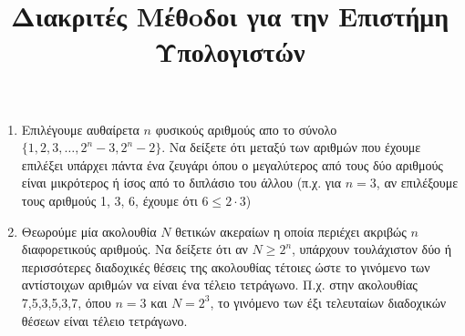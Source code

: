 \documentclass{assignment}
\begin{document}

\title{Διακριτές Μέθoδοι για την Επιστήμη Υπολογιστών}

\maketitle


\begin{enumerate}

\item
Επιλέγουμε αυθαίρετα $n$ φυσικούς αριθμούς απο το σύνολο $\{1,2,3,\dots,2^n-3, 2^n-2\}$. Να δείξετε ότι μεταξύ των αριθμών που έχουμε επιλέξει υπάρχει πάντα ένα ζευγάρι όπου ο μεγαλύτερος από τους δύο αριθμούς είναι μικρότερος ή ίσος από το διπλάσιο του άλλου (π.χ. για $n=3$, αν επιλέξουμε τους αριθμούς 1, 3, 6, έχουμε ότι $6 \leq 2 \cdot 3$)
\item
Θεωρούμε μία ακολουθία $N$ θετικών ακεραίων η οποία περιέχει ακριβώς $n$ διαφορετικούς αριθμούς. 
Να δείξετε ότι αν $N \ge 2^n$, υπάρχουν τουλάχιστον δύο ή περισσότερες διαδοχικές θέσεις της ακολουθίας τέτοιες ώστε το γινόμενο των αντίστοιχων αριθμών να είναι ένα τέλειο τετράγωνο. Π.χ. στην ακολουθίας 7,5,3,5,3,7, όπου $n=3$ και $N=2^3$, το γινόμενο των έξι τελευταίων διαδοχικών θέσεων είναι τέλειο τετράγωνο.
\end{enumerate}

\solution
\end{document}
